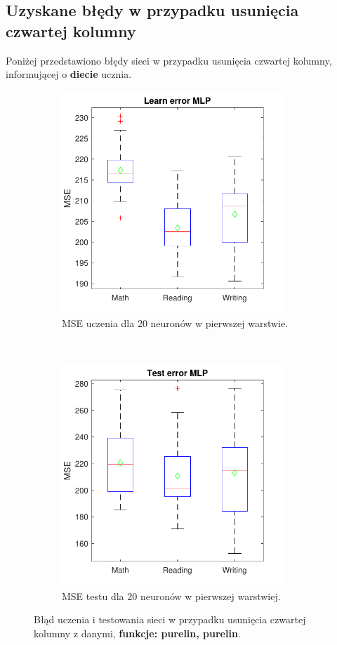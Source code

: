 \documentclass[12pt]{article}
\begin{document}
\subsection{Uzyskane błędy w przypadku usunięcia czwartej kolumny}
Poniżej przedstawiono błędy sieci w przypadku usunięcia czwartej kolumny, informującej o \textbf{diecie} ucznia.
\begin{figure}[H]
\centering
\begin{subfigure}[t]{0.48\textwidth} 
\centering
\includegraphics[height=3.3in]{purelin_purelin_20_without_4_learnBoxplot.pdf}
\caption{MSE uczenia dla  20 neuronów w pierwszej warstwie.}
\end{subfigure}
~~
\begin{subfigure}[t]{0.48\textwidth} 
\centering
\includegraphics[height=3.3in]{purelin_purelin_20_without_4_testBoxplot.pdf}
\caption{MSE testu dla  20  neuronów w pierwszej warstwiej.}
\end{subfigure}

\caption{Błąd uczenia i testowania sieci w przypadku usunięcia czwartej  kolumny z danymi, \textbf{funkcje: purelin, purelin}.}
\end{figure}
\end{document}
